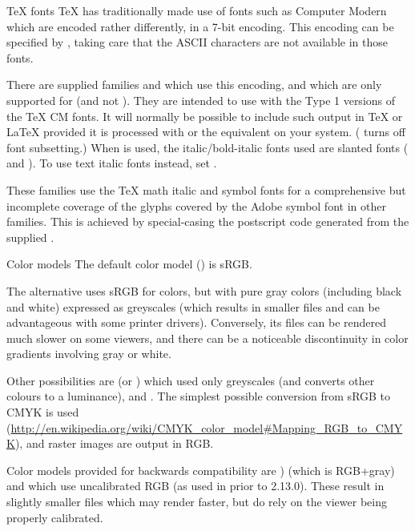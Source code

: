 %
\begin{Section}{TeX fonts}
TeX has traditionally made use of fonts such as Computer Modern which
are encoded rather differently, in a 7-bit encoding.  This encoding
can be specified by , taking care that
the ASCII characters \code{< > \bsl{} \_ \{ \}} are not available in those
fonts.

There are supplied families  and
 which use this encoding, and which are
only supported for  (and not ).  They are
intended to use with the Type 1 versions of the TeX CM fonts.  It will
normally be possible to include such output in TeX or LaTeX provided
it is processed with  or the equivalent on your
system. ( turns off font subsetting.)  When  is used, the italic/bold-italic fonts used are
slanted fonts ( and ).  To use text italic
fonts instead, set .

These families use the TeX math italic and  symbol fonts for a
comprehensive but incomplete coverage of the glyphs covered by the
Adobe symbol font in other families.  This is achieved by
special-casing the postscript code generated from the supplied
.
\end{Section}
%
\begin{Section}{Color models}
The default color model () is sRGB.

The alternative  uses sRGB for colors, but with pure
gray colors (including black and white) expressed as greyscales (which
results in smaller files and can be advantageous with some printer
drivers).  Conversely, its files can be rendered much slower on some
viewers, and there can be a noticeable discontinuity in color
gradients involving gray or white.

Other possibilities are  (or ) which used
only greyscales (and converts other colours to a luminance), and
.  The simplest possible conversion from sRGB to CMYK is
used
(\url{http://en.wikipedia.org/wiki/CMYK_color_model#Mapping_RGB_to_CMYK}),
and raster images are output in RGB.

Color models provided for backwards compatibility are )
(which is RGB+gray) and  which use uncalibrated RGB
(as used in \R{} prior to 2.13.0).  These result in slightly smaller
files which may render faster, but do rely on the viewer being
properly calibrated.
\end{Section}
